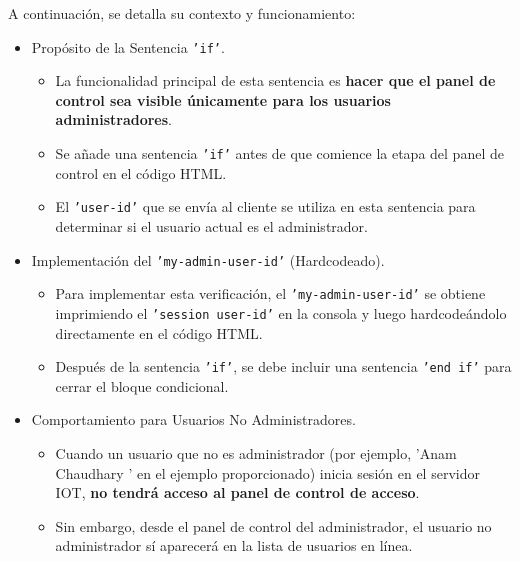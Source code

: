 \documentclass{report}
\begin{document}
A continuación, se detalla su contexto y funcionamiento:
\begin{itemize}
    \item Propósito de la Sentencia \texttt{'if'}.
    \begin{itemize}
        \item La funcionalidad principal de esta sentencia es \textbf{hacer que el panel de control sea visible únicamente para los usuarios administradores}.
        \item Se añade una sentencia \texttt{'if'} antes de que comience la etapa del panel de control en el código HTML.
        \item El \texttt{'user-id'} que se envía al cliente se utiliza en esta sentencia para determinar si el usuario actual es el administrador.
    \end{itemize}

    \item Implementación del \texttt{'my-admin-user-id'} (Hardcodeado).
    \begin{itemize}
        \item Para implementar esta verificación, el \texttt{'my-admin-user-id'} se obtiene imprimiendo el \texttt{'session user-id'} en la consola y luego
              hardcodeándolo directamente en el código HTML.
        \item Después de la sentencia \texttt{'if'}, se debe incluir una sentencia \texttt{'end if'} para cerrar el bloque condicional.
    \end{itemize}

    \item Comportamiento para Usuarios No Administradores.
    \begin{itemize}
        \item Cuando un usuario que no es administrador (por ejemplo,  'Anam Chaudhary ' en el ejemplo proporcionado) inicia sesión en el servidor IOT, 
              \textbf{no tendrá acceso al panel de control de acceso}.
        \item Sin embargo, desde el panel de control del administrador, el usuario no administrador sí aparecerá en la lista de usuarios en línea.
    \end{itemize}


\end{itemize}
\end{document}
